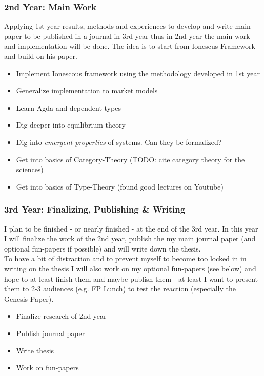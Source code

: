\subsubsection{2nd Year: Main Work}
Applying 1st year results, methods and experiences to develop and write main paper to be published in a journal in 3rd year thus in 2nd year the main  work and implementation will be done. The idea is to start from Ionescus Framework \cite{Botta20114025} and build on his paper.

\begin{itemize}
\item Implement Ionescous framework using the methodology developed in 1st year
\item Generalize implementation to market models
\item Learn Agda and dependent types
\item Dig deeper into equilibrium theory 
\item Dig into \textit{emergent properties} of systems. Can they be formalized?
\item Get into basics of Category-Theory \cite{Pierce1991} (TODO: cite category theory for the sciences)
\item Get into basics of Type-Theory (found good lectures on Youtube)

\end{itemize}

\subsubsection{3rd Year: Finalizing, Publishing \& Writing}
I plan to be finished - or nearly finished - at the end of the 3rd year. In this year I will finalize the work of the 2nd year, publish the my main journal paper (and optional fun-papers if possible) and will write down the thesis. \\ To have a bit of distraction and to prevent myself to become too locked in in writing on the thesis I will also work on my optional fun-papers (see below) and hope to at least finish them and maybe publish them - at least I want to present them to 2-3 audiences (e.g. FP Lunch) to test the reaction (especially the Genesis-Paper).

\begin{itemize}
\item Finalize research of 2nd year
\item Publish journal paper
\item Write thesis
\item Work on fun-papers
\end{itemize}

